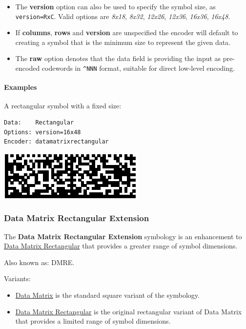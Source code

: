 \begin{itemize}
\item
  The \textbf{version} option can also be used to specify the symbol
  size, as \texttt{version=RxC}. Valid options are \emph{8x18},
  \emph{8x32}, \emph{12x26}, \emph{12x36}, \emph{16x36}, \emph{16x48}.
\item
  If \textbf{columns}, \textbf{rows} and \textbf{version} are
  unspecified the encoder will default to creating a symbol that is the
  minimum size to represent the given data.
\item
  The \textbf{raw} option denotes that the data field is providing the
  input as pre-encoded codewords in \texttt{\^{}NNN} format, suitable
  for direct low-level encoding.
\end{itemize}

\hypertarget{examples-7}{%
\paragraph{Examples}\label{examples-7}}

A rectangular symbol with a fixed size:

\begin{verbatim}
Data:    Rectangular
Options: version=16x48
Encoder: datamatrixrectangular
\end{verbatim}

\includegraphics{images/datamatrix-3.eps}

\hypertarget{data-matrix-rectangular-extension}{%
\subsubsection{Data Matrix Rectangular
Extension}\label{data-matrix-rectangular-extension}}

The \textbf{Data Matrix Rectangular Extension} symbology is an
enhancement to \protect\hyperlink{data-matrix-rectangular}{Data Matrix
Rectangular} that provides a greater range of symbol dimensions.

Also known as: DMRE.

Variants:

\begin{itemize}
\tightlist
\item
  \protect\hyperlink{data-matrix}{Data Matrix} is the standard square
  variant of the symbology.
\item
  \protect\hyperlink{data-matrix-rectangular}{Data Matrix Rectangular}
  is the original rectangular variant of Data Matrix that provides a
  limited range of symbol dimensions.
\end{itemize}

